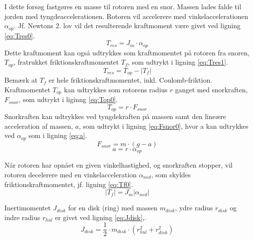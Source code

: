I dette forsøg fastgøres en masse til rotoren med en snor.
Massen lades falde til jorden med tyngdeaccelerationen.
Rotoren vil accelerere med vinkelaccelerationen \(\alpha_{op}\).
Jf. Newtons 2. lov vil det resulterende kraftmoment være givet ved ligning \ref{eq:Tres0}.
\begin{equation}
	T_{res}=J_m\cdot\alpha_{op}
	\label{eq:Tres0}
 \end{equation}
Dette kraftmoment kan også udtrykkes som kraftmomentet på rotoren fra snoren, \(T_{op}\),
fratrukket friktionskraftmomentet \(T_f\), som udtrykt i ligning \ref{eq:Tres1}.
\begin{equation}
	T_{res}=T_{op}-\left|T_f\right|
	\label{eq:Tres1}
 \end{equation}
Bemærk at \(T_f\) er hele friktionskraftmomentet, inkl. Coulomb-friktion.
Kraftmomentet \(T_{op}\) kan udtrykkes som rotorens radius \(r\) ganget med snorkraften, \(F_{snor}\),
som udtrykt i liginng \ref{eq:Top0}.
\begin{equation}
	T_{op}=r\cdot{F_{snor}}
	\label{eq:Top0}
 \end{equation}
Snorkraften kan udtrykkes ved tyngdekraften på massen samt den lineære acceleration af massen, \(a\),
som udtrykt i ligning \ref{eq:Fsnor0}, hvor a kan udtrykkes ved \(\alpha_{op}\) som i ligning \ref{eq:a}.
\begin{equation}
	F_{snor}=m\cdot(g-a)
	\label{eq:Fsnor0}
 \end{equation}
\begin{equation}
	a=r\cdot\alpha_{op}
	\label{eq:a}
 \end{equation}

Når rotoren har opnået en given vinkelhastighed, og snorkraften stopper,
vil rotoren decelerere med en vinkelacceleration \(\alpha_{ned}\), som skyldes friktionskraftmomentet,
jf. ligning \ref{eq:Tf0}.
\begin{equation}
	\left|T_f\right|=J_m\left|\alpha_{ned}\right|
	\label{eq:Tf0}
 \end{equation}

Inertimomentet \(J_{disk}\) for en disk (ring) med massen \(m_{disk}\), ydre radius \(r_{disk}\) og
indre radius \(r_{hul}\) er givet ved ligning \ref{eq:Jdisk},\citep[Side. 255, tabel 10-2b]{fund_of_physics}.
\begin{equation}
	J_{disk}=\frac{1}{2}\cdot{m_{disk}}\cdot\left(r_{hul}^2+r_{disk}^2\right)
	\label{eq:Jdisk}
 \end{equation}

